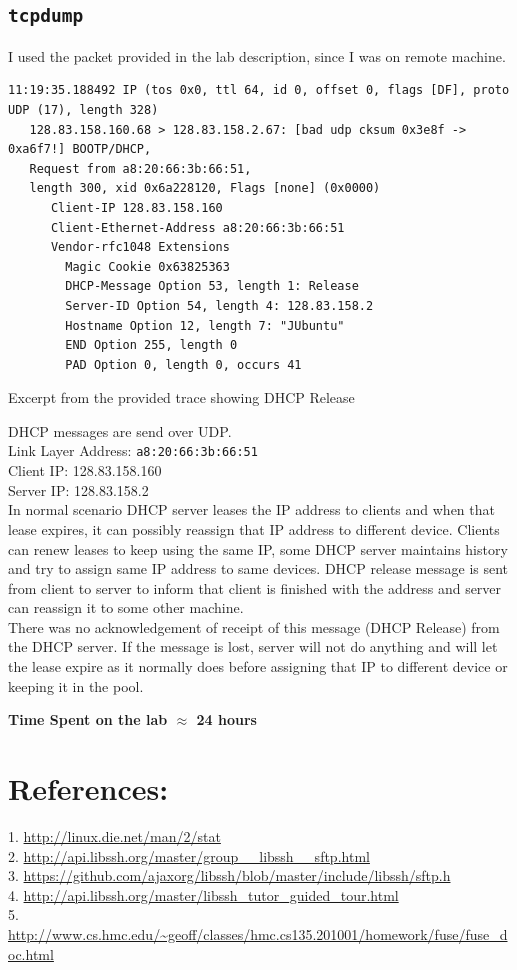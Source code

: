 \documentclass[10pt] {article}
\begin{document}
\subsection {\texttt{tcpdump}}
I used the packet provided in the lab description, since I was on remote machine. 

\begin{listing}[ht!]
\begin{verbatim}
11:19:35.188492 IP (tos 0x0, ttl 64, id 0, offset 0, flags [DF], proto UDP (17), length 328)
   128.83.158.160.68 > 128.83.158.2.67: [bad udp cksum 0x3e8f -> 0xa6f7!] BOOTP/DHCP, 
   Request from a8:20:66:3b:66:51,
   length 300, xid 0x6a228120, Flags [none] (0x0000)
	  Client-IP 128.83.158.160
	  Client-Ethernet-Address a8:20:66:3b:66:51
	  Vendor-rfc1048 Extensions
	    Magic Cookie 0x63825363
	    DHCP-Message Option 53, length 1: Release
	    Server-ID Option 54, length 4: 128.83.158.2
	    Hostname Option 12, length 7: "JUbuntu"
	    END Option 255, length 0
	    PAD Option 0, length 0, occurs 41
\end{verbatim}
\label{lst:sched}
\caption{Excerpt from the provided trace showing DHCP Release}
\end{listing}

DHCP messages are send over UDP. \\
Link Layer Address: \texttt{a8:20:66:3b:66:51} \\
Client IP: 128.83.158.160 \\
Server IP: 128.83.158.2 \\

In normal scenario DHCP server leases the IP address to clients and when that lease expires, it can possibly reassign that IP address to different device. Clients can renew leases to keep using the same IP, some DHCP server maintains history and try to assign same IP address to same devices. DHCP release message is sent from client to server to inform that client is finished with the address and server can reassign it to some other machine. \\

There was no acknowledgement of receipt of this message (DHCP Release) from the DHCP server. If the message is lost, server will not do anything and will let the lease expire as it normally does before assigning that IP to different device or keeping it in the pool.


\noindent \textbf{Time Spent on the lab \ensuremath{\approx} 24 hours} 

\section{References:}
1. \url{http://linux.die.net/man/2/stat}  \\
2. \url{http://api.libssh.org/master/group__libssh__sftp.html} \\
3. \url{https://github.com/ajaxorg/libssh/blob/master/include/libssh/sftp.h} \\
4. \url{http://api.libssh.org/master/libssh_tutor_guided_tour.html} \\
5. \url{http://www.cs.hmc.edu/~geoff/classes/hmc.cs135.201001/homework/fuse/fuse_doc.html}
\end{document}
